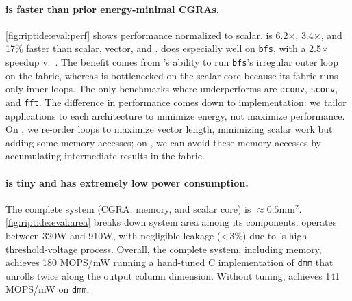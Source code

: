 \paragraph{\riptide is faster than prior energy-minimal CGRAs.}
\autoref{fig:riptide:eval:perf} shows performance normalized to scalar.
%
\riptide is 6.2$\times$, 3.4$\times$, and 17\% faster than scalar, vector, and \snafu.
%
%
%
%
% 
\riptide does especially well on {\tt bfs}, with a 2.5$\times$ speedup v.\ \snafu. The benefit comes
from \riptide's ability to run {\tt bfs}'s irregular outer loop on the fabric, whereas
% 
\snafu is bottlenecked on the scalar core because its fabric runs only inner loops. %
% 
The only benchmarks where \riptide underperforms \snafu are {\tt dconv}, {\tt sconv}, and {\tt fft}.
% 
The difference in performance comes down to implementation: we tailor applications to each architecture to minimize energy, not maximize performance.
% 
On \snafu, we re-order loops to maximize vector length, minimizing scalar work but adding some memory accesses;
on \riptide, we can avoid these memory accesses by accumulating intermediate results in the fabric.

\figRipTideArea
\tabRipTideEvalCompare
\figRipTidePrimaryCompilerResults

\paragraph{\riptide is tiny and has extremely low power consumption.}
\label{sec:eval:power_area}
The complete \riptide system (CGRA, memory, and scalar core) is $\approx 0.5\text{mm}^2$.
\autoref{fig:riptide:eval:area} breaks down system area among its components.
\riptide operates between 320\textmu W and 910\textmu W,
with negligible leakage (<\,3\%) due to \riptide's high-threshold-voltage process.
% 
Overall, the complete system, including memory, achieves
180 MOPS/mW running a hand-tuned C implementation of {\tt dmm} that unrolls twice along the output column dimension.
% 
Without tuning, \riptide achieves 141 MOPS/mW on {\tt dmm}.

